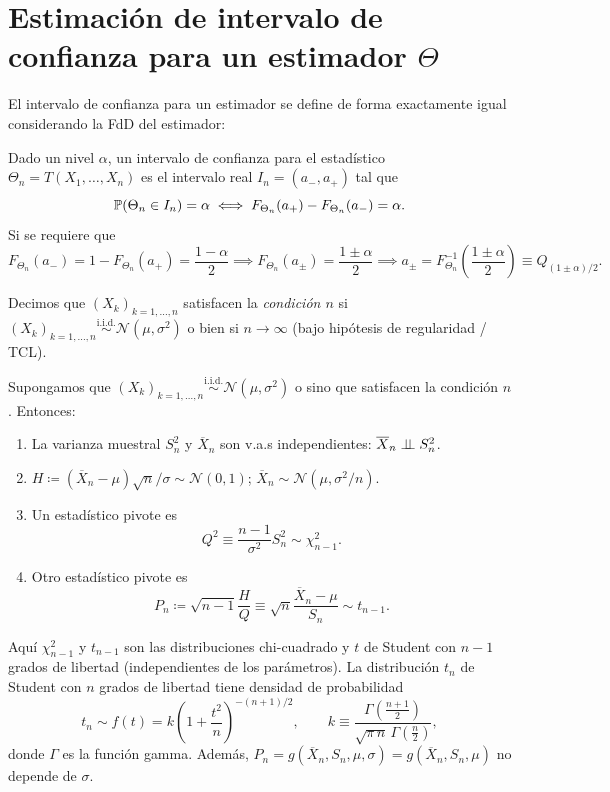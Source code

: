 \section{Estimación de intervalo de confianza para un estimador $\Theta$}

El intervalo de confianza para un estimador se define de forma exactamente igual considerando la FdD del estimador:

\begin{definicion}
Dado un nivel $\alpha$, un intervalo de confianza para el estadístico $\Theta_n = T(X_1, \dots, X_n)$ es el intervalo real $I_n = (a_-, a_+)$ tal que
\[
  \mathbb{P}(\Theta_n \in I_n) = \alpha \iff F_{\Theta_n}(a_+) - F_{\Theta_n}(a_-) = \alpha.
\]
Si se requiere que
\[
  F_{\Theta_n}(a_-) = 1 - F_{\Theta_n}(a_+) = \frac{1-\alpha}{2}
  \implies F_{\Theta_n}(a_\pm) = \frac{1\pm\alpha}{2} \implies a_\pm = F_{\Theta_n}^{-1}\left(\frac{1\pm\alpha}{2}\right) \equiv Q_{(1\pm\alpha)/2}.
\]
\end{definicion}

\begin{definicion}[68 --- Condición $n$]
Decimos que $(X_k)_{k=1,\dots,n}$ satisfacen la \emph{condición $n$} si $(X_k)_{k=1,\dots,n} \stackrel{\text{i.i.d.}}{\sim} \mathcal{N}(\mu, \sigma^2)$ o bien si $n \to \infty$ (bajo hipótesis de regularidad / TCL).
\end{definicion}

\begin{teorema}
Supongamos que $(X_k)_{k=1,\dots,n} \stackrel{\text{i.i.d.}}{\sim} \mathcal{N}(\mu, \sigma^2)$ o sino que satisfacen la condición $n$. Entonces:
\begin{enumerate}
  \item La varianza muestral $S_n^2$ y $\overline{X}_n$ son v.a.s independientes: $\overline{X}_n \perp\!\!\!\perp S_n^2$.
  \item $H \coloneqq (\overline{X}_n - \mu)\sqrt{n}/\sigma \sim \mathcal{N}(0,1)$; $\overline{X}_n \sim \mathcal{N}(\mu, \sigma^2/n)$.
  \item Un estadístico pivote es
  \[
    Q^2 \equiv \frac{n-1}{\sigma^2}S_n^2 \sim \chi_{n-1}^2.
  \]
  \item Otro estadístico pivote es
  \[
    P_n \coloneqq \sqrt{n-1}\frac{H}{Q} \equiv \sqrt{n}\frac{\overline{X}_n - \mu}{S_n} \sim t_{n-1}.
  \]
\end{enumerate}
Aquí $\chi_{n-1}^2$ y $t_{n-1}$ son las distribuciones chi-cuadrado y $t$ de Student con $n-1$ grados de libertad (independientes de los parámetros). La distribución $t_n$ de Student con $n$ grados de libertad tiene densidad de probabilidad
\[
  t_n \sim f(t) = k\left(1 + \frac{t^2}{n}\right)^{-(n+1)/2}, \qquad k \equiv \frac{\Gamma\left(\frac{n+1}{2}\right)}{\sqrt{\pi\,n}\,\Gamma\left(\frac{n}{2}\right)},
\]
donde $\Gamma$ es la función gamma. Además, $P_n = g(\overline{X}_n, S_n, \mu, \sigma) = g(\overline{X}_n, S_n, \mu)$ no depende de $\sigma$.
\end{teorema}

